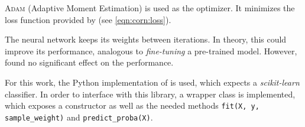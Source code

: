 \textsc{Adam} (Adaptive Moment Estimation) \cite{adam} is used as the optimizer.
It minimizes the loss function provided by \corn{} (see \autoref{eqn:corn:loss}).

The neural network keeps its weights between \dsea{} iterations.
In theory,
  this could improve its performance,
    analogous to \emph{fine-tuning} a pre-trained model.
However,
\cite{dsea_samuel}
found
no significant effect on the performance.


For this work, the Python implementation of \dsea{} \cite{dsea_code} is used,
  which expects a \emph{scikit-learn} classifier.
In order to interface with this library,
a wrapper class is implemented,
  which exposes a constructor as well as the needed methods
  \texttt{fit(X, y, sample_weight)} and
  \texttt{predict_proba(X)}.

\smallskip %
